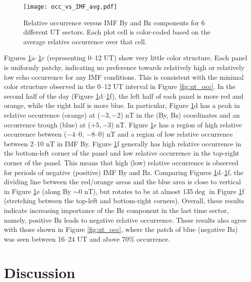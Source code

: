 \begin{figure}
\texttt{[image: occ\_vs\_IMF\_avg.pdf]}
\caption{Relative occurrence versus IMF By and Bz components for 6 different UT sectors. Each plot cell is color-coded based on the average relative occurrence over that cell.}
\label{fig:by_bz}
\end{figure}

Figures \ref{fig:by_bz}a--\ref{fig:by_bz}c (representing 0--12 UT) show very little color structure.  Each panel is uniformly patchy, indicating no preference towards relatively high or relatively low echo occurrence for any IMF conditions. This is consistent with the minimal color structure observed in the 0--12 UT interval in Figure \ref{fig:ut_occ}. In the second half of the day (Figure \ref{fig:by_bz}d--\ref{fig:by_bz}f), the left half of each panel is more red and orange, while the right half is more blue. In particular, Figure \ref{fig:by_bz}d has a peak in relative occurrence (orange) at (\(-3, -2\)) nT in the (By, Bz) coordinates and an occurrence trough (blue) at (\(+5, -3\)) nT. Figure \ref{fig:by_bz}e has a region of high relative occurrence between (\(-\)4--0, \(-\)8--0) nT and a region of low relative occurrence between 2--10 nT in IMF By.  Figure \ref{fig:by_bz}f generally has high relative occurrence in the bottom-left corner of the panel and low relative occurrence in the top-right corner of the panel. This means that high (low) relative occurrence is observed for periods of negative (positive) IMF By and Bz. Comparing Figures \ref{fig:by_bz}d--\ref{fig:by_bz}f, the dividing line between the red/orange areas and the blue area is close to vertical in Figure \ref{fig:by_bz}e (along By \(\sim\)0 nT), but rotates to be at almost 135\(\deg\) in Figure \ref{fig:by_bz}f (stretching between the top-left and bottom-right corners). Overall, these results indicate increasing importance of the Bz component in the last time sector, namely, positive Bz leads to negative relative occurrence. These results also agree with those shown in Figure \ref{fig:ut_occ}, where the patch of blue (negative Bz) was seen between 16--24 UT and above 70\% occurrence.



\section{Discussion}

